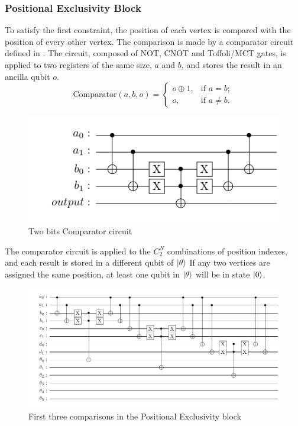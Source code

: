 \documentclass[10pt,a4paper]{article}
\begin{document}
\subsubsection{Positional Exclusivity Block}
To satisfy the first constraint, the position of each vertex is compared with the position of every other vertex. The comparison is made by a comparator circuit defined in \cite{Coloring1}. The circuit, composed of NOT, CNOT and Toffoli/MCT gates, is applied to two registers of the same size, $a$ and $b$, and  stores the result in an ancilla qubit $o$.
$$\text{Comparator}(a, b, o) =
\begin{cases}
o \oplus 1, & \text{if } a = b; \\
o, & \text{if } a \neq b.
\end{cases}$$
\begin{figure}[hbtp]
\centering
\includegraphics[scale=0.5]{figures/comparator.pdf}
\caption{Two bits Comparator circuit}
\end{figure}

The comparator circuit is applied to the $C^N_2$ combinations of position indexes, and each result is stored in a different qubit of $\ket{\theta}$ If any two vertices are assigned the same position, at least one qubit in $\ket{\theta}$ will be in state $\ket{0}$.

\begin{figure}[hbtp]
\centering
\includegraphics[scale=0.5]{figures/comparator_extended.pdf}
\caption{First three comparisons in the Positional Exclusivity block}
\end{figure}
\end{document}
